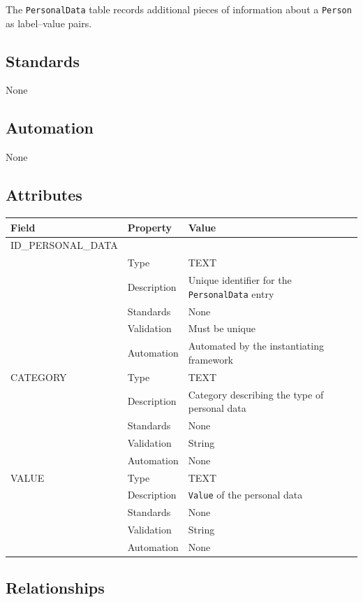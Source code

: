 \documentclass[
]{article}
\newcounter{none}
\begin{document}
The \texttt{PersonalData} table records additional pieces of information
about a \texttt{Person} as label--value pairs.

\subsection{Standards}\label{standards-23}

None

\subsection{Automation}\label{automation-23}

None

\subsection{Attributes}\label{attributes-20}

{\def\LTcaptype{none} 
\begin{longtable}[]{@{}lll@{}}
\toprule\noalign{}
Field & Property & Value \\
\midrule\noalign{}
\endhead
\bottomrule\noalign{}
\endlastfoot
ID\_PERSONAL\_DATA & & \\
& Type & TEXT \\
& Description & Unique identifier for the \texttt{PersonalData} entry \\
& Standards & None \\
& Validation & Must be unique \\
& Automation & Automated by the instantiating framework \\
CATEGORY & Type & TEXT \\
& Description & Category describing the type of personal data \\
& Standards & None \\
& Validation & String \\
& Automation & None \\
VALUE & Type & TEXT \\
& Description & \texttt{Value} of the personal data \\
& Standards & None \\
& Validation & String \\
& Automation & None \\
\end{longtable}
}

\subsection{Relationships}\label{relationships-18}
\end{document}
